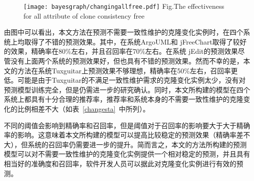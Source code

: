 \begin{figure}[htbp]
\centering
\texttt{[image: bayesgraph/changingallfree.pdf]}
{Fig.$\!$}{The effectiveness for all attribute of clone consistency free}
\vspace{-1em}
\end{figure}

由图中可以看出，本文方法在预测不需要一致性维护的克隆变化实例时，在四个系统上均取得了不错的预测效果。其中，在系统ArgoUML和 jFreeChart取得了较好的效果，精确率在80\%左右，并且召回率在70\%左右。在系统 jEdit的预测效果尽管没有上面两个系统的预测效果好，但也具有不错的预测效果。然而不幸的是，本文的方法在系统Tuxguitar上预测效果不够理想，精确率在50\%左右，召回率更低。可能是由于Tuxguitar的不满足一致性维护需求的克隆变化实例太少，没有对预测模型训练完全，但是仍需进一步的研究确认。同时，本文所构建的模型在四个系统上都具有十分合理的推荐率，推荐率和系统本身的不需要一致性维护的克隆变化的比例相差不大（如表~\ref{changesta}~中所列）。

不同的阈值会影响到精确率和召回率，但是阈值对于召回率的影响要大于大于精确率的影响。这意味着本文所构建的模型可以提高比较稳定的预测效果（精确率差不大），但系统的召回率仍需要进一步的提升。简而言之，本文的方法所构建的预测模型可以对不需要一致性维护的克隆变化实例提供一个相对稳定的预测，并且具有相当好的准确度和召回率，软件开发人员可以据此对克隆变化实例进行有效的预测。

